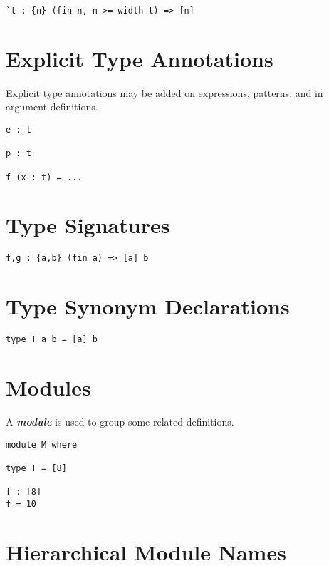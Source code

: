 \begin{verbatim}
`t : {n} (fin n, n >= width t) => [n]
\end{verbatim}

\hypertarget{explicit-type-annotations}{%
\section{Explicit Type Annotations}\label{explicit-type-annotations}}

Explicit type annotations may be added on expressions, patterns, and in
argument definitions.

\begin{verbatim}
e : t

p : t

f (x : t) = ...
\end{verbatim}

\hypertarget{type-signatures}{%
\section{Type Signatures}\label{type-signatures}}

\begin{verbatim}
f,g : {a,b} (fin a) => [a] b
\end{verbatim}

\hypertarget{type-synonym-declarations}{%
\section{Type Synonym Declarations}\label{type-synonym-declarations}}

\begin{verbatim}
type T a b = [a] b
\end{verbatim}

\hypertarget{modules}{%
\section{Modules}\label{modules}}

A \textbf{\emph{module}} is used to group some related definitions.

\begin{verbatim}
module M where

type T = [8]

f : [8]
f = 10
\end{verbatim}

\hypertarget{hierarchical-module-names}{%
\section{Hierarchical Module Names}\label{hierarchical-module-names}}

